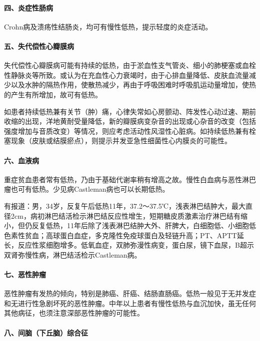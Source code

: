 \paragraph{四、炎症性肠病}

Crohn病及溃疡性结肠炎，均可有慢性低热，提示轻度的炎症活动。

\paragraph{五、失代偿性心瓣膜病}

失代偿性心瓣膜病可能有持续的低热，由于淤血性支气管炎、细小的肺梗塞或血栓性静脉炎等所致。或认为在充血性心力衰竭时，由于心排血量降低、皮肤血流量减少以及水肿的隔热作用，使散热减少，再由于呼吸困难时呼吸肌运动量增加，使热的产生有所增加，故可有低热。

如患者持续低热兼有关节（肿）痛，心律失常如心房颤动、阵发性心动过速、期前收缩的出现，洋地黄耐受量降低，新的瓣膜病变杂音的出现或心杂音的改变（包括强度增加与音质改变）等情况，则应考虑活动性风湿性心脏病。如持续低热兼有栓塞现象（皮肤或结膜瘀点），则提示并发亚急性细菌性心内膜炎的可能性。

\paragraph{六、血液病}

重症贫血患者常有低热，乃由于基础代谢率稍有增高之故。慢性白血病与恶性淋巴瘤也可有低热。少见病Castleman病也可以长期低热。

有报道：男，34岁，反复午后低热11年，37.2～37.5℃，浅表淋巴结肿大，最大直径2cm，病初淋巴结活检示淋巴结反应性增生，短期糖皮质激素治疗淋巴结有缩小，但仍反复低热，11年后除了浅表淋巴结肿大外、肝脾大，白细胞低、小细胞低色素性贫血；高球蛋白血症，多克隆性免疫球蛋白及轻链升高；PT、APTT延长，反应性浆细胞增多。低氧血症，双肺弥漫性病变，蛋白尿，镜下血尿，B超示双肾弥慢性病，淋巴结活检示Castleman病。

\paragraph{七、恶性肿瘤}

恶性肿瘤有发热的倾向，特别是肺癌、肝癌、结肠直肠癌。低热一般见于无并发症和无进行性急剧坏死的恶性肿瘤。中年以上患者有慢性低热与血沉加快，虽无任何其他病征，也须注意深部恶性肿瘤的可能性。

\paragraph{八、间脑（下丘脑）综合征}

